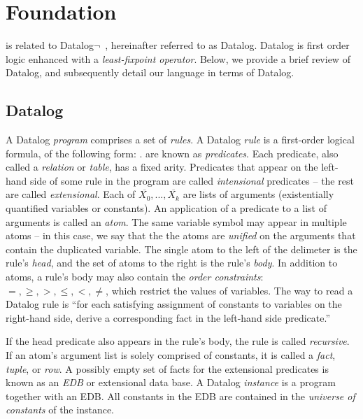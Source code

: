 \section{Foundation}
\label{sec:lang}

\lang is related to Datalog$\lnot$~\cite{ullmanbook}, hereinafter referred to
as Datalog.  Datalog is first order logic enhanced with a {\em least-fixpoint
operator}.  
Below, we provide a brief review of Datalog, and subsequently
detail our language in terms of Datalog.

\subsection{Datalog}
\label{sec:datalog}

A Datalog {\em program} comprises a set of {\em rules}.  A Datalog {\em rule}
is a first-order logical formula, of the following form:
.   are known as {\em
predicates}.  Each predicate, also called a {\em relation} or {\em table}, has
a fixed arity.  Predicates that appear on the left-hand side of some rule in
the program are called {\em intensional} predicates -- the rest are called {\em
extensional}.  Each of $\overline{X_0}, ..., \overline{X_k}$ are lists of
arguments (existentially quantified variables or constants).  An application of
a predicate to a list of arguments is called an {\em atom}.  The same variable
symbol may appear in multiple atoms -- in this case, we say that the the atoms
are {\em unified} on the arguments that contain the duplicated variable.  The
single atom to the left of the \dedalus{:-} delimeter is the rule's {\em head},
and the set of atoms to the right is the rule's {\em body}.  In addition to
atoms, a rule's body may also contain the {\em order constraints}: $=, \geq, >,
\leq, <, \neq$, which restrict the values of variables.  The way to read a
Datalog rule is ``for each satisfying assignment of constants to variables on
the right-hand side, derive a corresponding fact in the left-hand side
predicate.'' 

If the head predicate also appears in the rule's body, the rule is called {\em
recursive}.  If an atom's argument list is solely comprised of constants, it is
called a {\em fact}, {\em tuple}, or {\em row}.  A possibly empty set of facts
for the extensional predicates is known as an {\em EDB} or extensional data
base.  A Datalog {\em instance} is a program together with an EDB.  All
constants in the EDB are contained in the {\em universe of constants} of the
instance.


